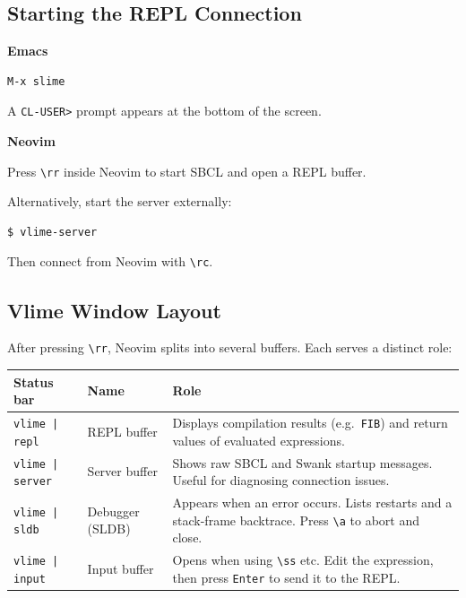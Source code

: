 \documentclass[a4paper,11pt]{article}
\newcommand{\key}[1]{\texttt{#1}}
\newlength{\colwidth}
\newcommand{\colheader}[1]{\textbf{\large #1}\par\medskip}
\begin{document}
\subsection{Starting the REPL Connection}

\noindent
\begin{minipage}[t]{\colwidth}
  \colheader{Emacs}
\begin{lstlisting}[style=shell,style=narrow]
M-x slime
\end{lstlisting}
  A \texttt{CL-USER>} prompt appears at the bottom of the screen.
\end{minipage}\hfill
\begin{minipage}[t]{\colwidth}
  \colheader{Neovim}
  Press \key{\textbackslash rr} inside Neovim to start SBCL and open a REPL buffer.

  \medskip
  Alternatively, start the server externally:
\begin{lstlisting}[style=shell,style=narrow]
$ vlime-server
\end{lstlisting}
  Then connect from Neovim with \key{\textbackslash rc}.
\end{minipage}

\subsection{Vlime Window Layout}

After pressing \key{\textbackslash rr}, Neovim splits into several buffers.
Each serves a distinct role:

\begin{center}
\begin{tabular}{llp{7.5cm}}
  \toprule
  \textbf{Status bar} & \textbf{Name} & \textbf{Role} \\
  \midrule
  \texttt{vlime | repl}   & REPL buffer
    & Displays compilation results (e.g.\ \texttt{FIB}) and
      return values of evaluated expressions. \\
  \texttt{vlime | server} & Server buffer
    & Shows raw SBCL and Swank startup messages.
      Useful for diagnosing connection issues. \\
  \texttt{vlime | sldb}   & Debugger (SLDB)
    & Appears when an error occurs.
      Lists restarts and a stack-frame backtrace.
      Press \key{\textbackslash a} to abort and close. \\
  \texttt{vlime | input}  & Input buffer
    & Opens when using \key{\textbackslash ss} etc.
      Edit the expression, then press \key{Enter} to send it to the REPL. \\
  \bottomrule
\end{tabular}
\end{center}
\end{document}
